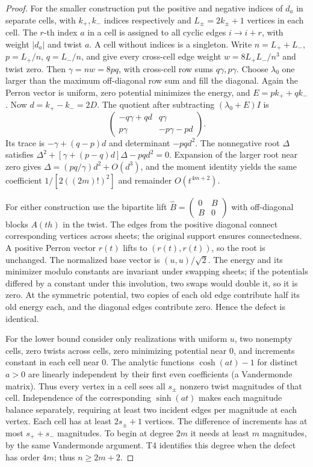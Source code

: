 \documentclass[11pt]{article}
\begin{document}
\begin{proof}
For the smaller construction put the positive and negative indices of
\(d_a\) in separate cells, with \(k_+,k_-\) indices respectively and
\(L_\pm=2k_\pm+1\) vertices in each cell. The \(r\)-th index \(a\) in a
cell is assigned to all cyclic edges \(i\to i+r\), with weight
\(|d_a|\) and twist \(a\). A cell without indices is a singleton.
Write \(n=L_++L_-\), \(p=L_+/n\), \(q=L_-/n\), and give every
cross-cell edge weight \(w=8L_+L_-/n^3\) and twist zero.
Then \(\gamma=nw=8pq\), with cross-cell row sums \(q\gamma,p\gamma\).
Choose \(\lambda_0\) one larger than the maximum off-diagonal row
sum and fill the diagonal. Again the Perron vector is uniform, zero
potential minimizes the energy, and \(E=p k_++q k_-\).
Now \(d=k_+-k_-=2D\). The quotient after subtracting
\((\lambda_0+E)I\) is
\[
 \begin{pmatrix} -q\gamma+qd & q\gamma\\ p\gamma &-p\gamma-pd\end{pmatrix}.
\]
Its trace is \(-\gamma+(q-p)d\) and determinant \(-pq d^2\).
The nonnegative root \(\Delta\) satisfies
\(\Delta^2+[\gamma+(p-q)d]\Delta-pq d^2=0\).
Expansion of the larger root near zero gives
\(\Delta=(pq/\gamma)d^2+O(d^3)\), and the moment identity yields
the same coefficient \(1/[2((2m)!)^2]\) and remainder \(O(t^{4m+2})\).

For either construction use the bipartite lift
\(\widehat B=\left(\begin{smallmatrix}0&B\\ B&0\end{smallmatrix}\right)\)
with off-diagonal blocks \(A(th)\) in the twist. The edges from the
positive diagonal connect corresponding vertices across sheets; the
original support ensures connectedness. A positive Perron vector
\(r(t)\) lifts to \((r(t),r(t))\), so the root is unchanged.
The normalized base vector is \((u,u)/\sqrt2\). The energy and
its minimizer modulo constants are invariant under swapping sheets;
if the potentials differed by a constant under this involution, two
swaps would double it, so it is zero. At the symmetric potential,
two copies of each old edge contribute half its old energy each,
and the diagonal edges contribute zero. Hence the defect is identical.

For the lower bound consider only realizations with uniform \(u\),
two nonempty cells, zero twists across cells, zero minimizing potential
near \(0\), and increments constant in each cell near \(0\).
The analytic functions \(\cosh(at)-1\) for distinct \(a>0\) are linearly
independent by their first even coefficients (a Vandermonde matrix).
Thus every vertex in a cell sees all \(s_\pm\) nonzero twist magnitudes
of that cell. Independence of the corresponding \(\sinh(at)\) makes
each magnitude balance separately, requiring at least two incident
edges per magnitude at each vertex. Each cell has at least \(2s_\pm+1\)
vertices. The difference of increments has at most \(s_++s_-\)
magnitudes. To begin at degree \(2m\) it needs at least \(m\)
magnitudes, by the same Vandermonde argument. T4 identifies this degree
when the defect has order \(4m\); thus \(n\geq2m+2\).
\end{proof}
\end{document}
